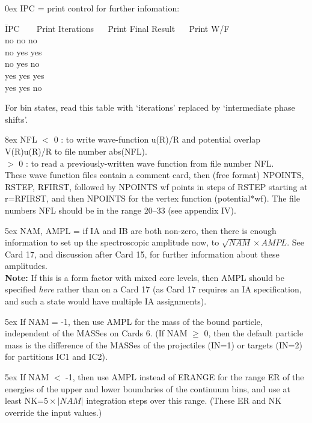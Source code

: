 \documentclass[11pt]{article}
\begin{document}
\bigskip

%
\hangindent 0ex
IPC = print control for further infomation:

\begin{tabbing}
\=IPC ~ ~ \=Print Iterations~ ~ \=Print Final Result ~ ~\=Print W/F\\
  \>no \>no \>no\\
  \>no \>yes \>yes\\
  \>no \>yes \>no\\
  \>yes \>yes \>yes\\
  \>yes \>yes \>no\\
\end{tabbing}

For bin states, read this table with `iterations' replaced by `intermediate
phase shifts'.


\hangindent 8ex  
NFL   $<$ 0    : to write wave-function u(R)/R and potential overlap
V(R)u(R)/R to file number abs(NFL).
\\  $>$ 0 : to read a previously-written wave function from file number
NFL.
\\ These wave function files contain a comment card,
then (free format) NPOINTS, RSTEP, RFIRST,
followed by NPOINTS wf points in steps of RSTEP starting at r=RFIRST,
and then NPOINTS for the vertex function (potential*wf).
The file numbers NFL should be in the range 20--33 (see appendix IV).



\hangindent 5ex
NAM, AMPL = if IA and IB are both non-zero, then there is enough
information to set up the spectroscopic amplitude now,
to  $\sqrt{NAM} \times AMPL$.
See Card 17, and discussion after Card 15, for further information
about these amplitudes.\\
{\bf Note:} If this is a form factor with mixed core levels,
then AMPL should be specified {\em here} rather than on a Card 17
(as Card 17 requires an IA specification, and such a state would
have multiple IA assignments).

\hangindent 5ex
If NAM = -1, then use AMPL for the mass of the bound particle,
independent of the MASSes on Cards 6.
(If NAM $\geq$ 0, then the default particle mass is the difference of
the MASSes of the projectiles (IN=1) or targets (IN=2) for partitions
IC1 and IC2).

\hangindent 5ex
If NAM $<$ -1, then use AMPL instead of ERANGE for the range ER of the
energies of the upper
and lower boundaries of the continuum bins, and use at least
NK=$5\times|NAM|$ integration steps over this range.
(These ER and NK override the input values.)
\end{document}
